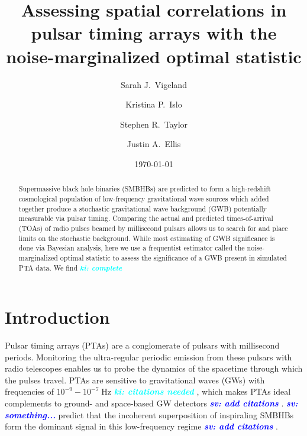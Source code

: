 \documentclass[twocolumn,aps,prd,superscriptaddress]{revtex4-1}
\newcommand{\sv}[1]{\textcolor{blue}{\it{\textbf{sv: #1}}} }
\newcommand{\ki}[1]{\textcolor{cyan}{\it{\textbf{ki: #1}}} }
\begin{document}
\title{Assessing spatial correlations in pulsar timing arrays with the noise-marginalized optimal statistic}


\author{Sarah J.\ Vigeland}

\author{Kristina P.\ Islo}

\author{Stephen R.\ Taylor}

\author{Justin A.\ Ellis}

\date{\today}  

\begin{abstract}
Supermassive black hole binaries (SMBHBs) are predicted to form a high-redshift cosmological population of low-frequency gravitational wave sources which added together produce a stochastic gravitational wave background (GWB) potentially measurable via pulsar timing. Comparing the actual and predicted times-of-arrival (TOAs) of radio pulses beamed by millisecond pulsars allows us to search for and place limits on the stochastic background. While most estimating of GWB significance is done via Bayesian analysis, here we use a frequentist estimator called the noise-marginalized optimal statistic to assess the significance of a GWB present in simulated PTA data. We find \ki{complete}

\end{abstract}

\maketitle


\section{Introduction}

Pulsar timing arrays (PTAs) are a conglomerate of pulsars with millisecond periods. 
Monitoring the ultra-regular periodic emission from these pulsars with radio telescopes 
enables us to probe the dynamics of the spacetime through which the pulses travel. 
PTAs are sensitive to gravitational waves (GWs) with frequencies of 
$10^{-9} - 10^{-7}\;\mathrm{Hz}$ \ki{citations needed}, 
which makes PTAs ideal complements to ground- and space-based GW detectors \sv{add citations}. 
\sv{something...} predict that the incoherent superposition of inspiraling SMBHBs form the dominant signal in this low-frequency regime \sv{add citations}.
\end{document}
